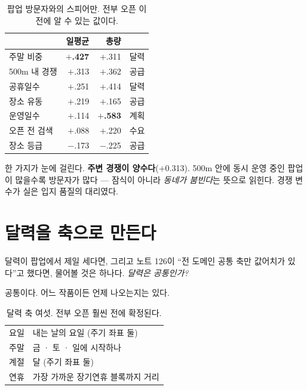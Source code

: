 \documentclass[10pt]{article}
\begin{document}
\begin{table}[t]
\centering\tsize
\caption{팝업 방문자와의 스피어만. 전부 오픈 이전에 알 수 있는 값이다.}
\begin{tabular}{lrrl}
\toprule
& 일평균 & 총량 & \\
\midrule
주말 비중 & \textbf{$+$.427} & $+$.311 & 달력 \\
500m 내 경쟁 & $+$.313 & $+$.362 & 공급 \\
공휴일수 & $+$.251 & $+$.414 & 달력 \\
장소 유동 & $+$.219 & $+$.165 & 공급 \\
운영일수 & $+$.114 & \textbf{$+$.583} & 계획 \\
오픈 전 검색 & $+$.088 & $+$.220 & 수요 \\
장소 등급 & $-$.173 & $-$.225 & 공급 \\
\bottomrule
\end{tabular}
\end{table}


한 가지가 눈에 걸린다. \textbf{주변 경쟁이 양수다}($+$0.313). 500m 안에
동시 운영 중인 팝업이 많을수록 방문자가 많다 --- 잠식이 아니라 \emph{동네가
붐빈다}는 뜻으로 읽힌다. 경쟁 변수가 실은 입지 품질의 대리였다.

\section{달력을 축으로 만든다}

달력이 팝업에서 제일 세다면, 그리고 노트 126이 ``전 도메인 공통 축만
값어치가 있다''고 했다면, 물어볼 것은 하나다. \emph{달력은 공통인가?}

공통이다. 어느 작품이든 언제 나오는지는 있다.

\begin{table}[t]
\centering\tsize
\caption{달력 축 여섯. 전부 오픈 훨씬 전에 확정된다.}
\begin{tabular}{ll}
\toprule
요일 & 내는 날의 요일 (주기 좌표 둘) \\
주말 & 금 · 토 · 일에 시작하나 \\
계절 & 달 (주기 좌표 둘) \\
연휴 & 가장 가까운 장기연휴 블록까지 거리 \\
\bottomrule
\end{tabular}
\end{table}
\end{document}
